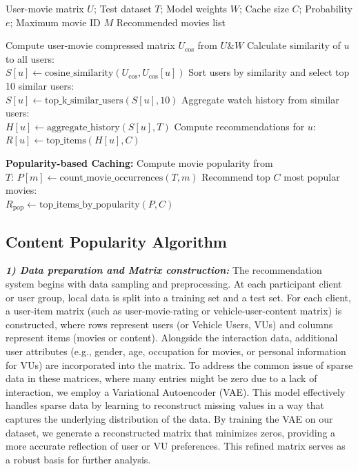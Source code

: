 \documentclass[journal]{IEEEtran}
\begin{document}
\begin{algorithm} [t]
\caption{Recommendation System Algorithm with Popularity-based Caching}
\label{alg:recommendation_system}
\begin{algorithmic}[1]
\REQUIRE User-movie matrix $U$; Test dataset $T$; Model weights $W$; Cache size $C$; Probability $e$; Maximum movie ID $M$
\ENSURE Recommended movies list

\STATE Compute user-movie compressed matrix $U_{\text{cos}}$ from $U \& W$
    \STATE Calculate similarity of $u$ to all users: \\$S[u] \leftarrow \text{cosine\_similarity}(U_{\text{cos}}, U_{\text{cos}}[u])$
    \STATE Sort users by similarity and select top 10 similar users: \\$S[u] \leftarrow \text{top\_k\_similar\_users}(S[u], 10)$
    \STATE Aggregate watch history from similar users: \\$H[u] \leftarrow \text{aggregate\_history}(S[u], T)$
    \STATE Compute recommendations for $u$: \\$R[u] \leftarrow \text{top\_items}(H[u], C)$
\ENDFOR

\STATE \textbf{Popularity-based Caching:} 
\STATE Compute movie popularity from \\$T$: $P[m] \leftarrow \text{count\_movie\_occurrences}(T, m)$
\STATE Recommend top $C$ most popular movies:\\ $R_{\text{pop}} \leftarrow \text{top\_items\_by\_popularity}(P, C)$

\end{algorithmic}
\end{algorithm}
\subsection{ Content Popularity Algorithm}

\textbf{\textit{1) Data preparation and Matrix construction:}} The recommendation system begins with data sampling and preprocessing. At each participant client or user group, local data is split into a training set and a test set. For each client, a user-item matrix (such as user-movie-rating or vehicle-user-content matrix) is constructed, where rows represent users (or Vehicle Users, VUs) and columns represent items (movies or content). Alongside the interaction data, additional user attributes (e.g., gender, age, occupation for movies, or personal information for VUs) are incorporated into the matrix. To address the common issue of sparse data in these matrices, where many entries might be zero due to a lack of interaction, we employ a Variational Autoencoder (VAE). This model effectively handles sparse data by learning to reconstruct missing values in a way that captures the underlying distribution of the data. By training the VAE on our dataset, we generate a reconstructed matrix that minimizes zeros, providing a more accurate reflection of user or VU preferences. This refined matrix serves as a robust basis for further analysis.
\end{document}
